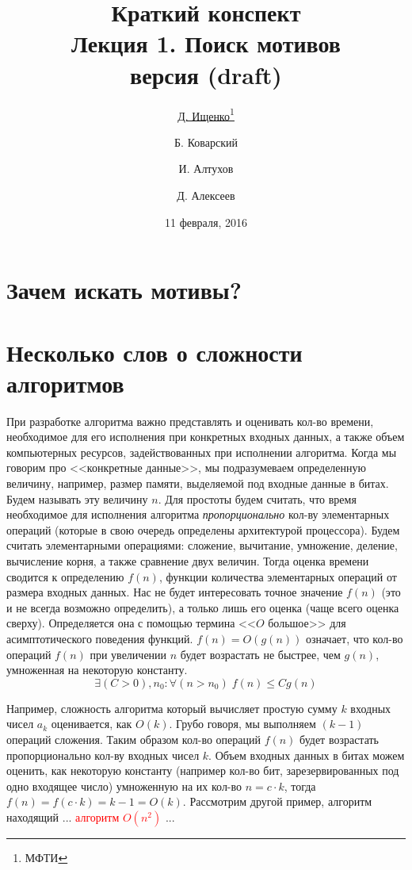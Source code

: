 \documentclass[letterpaper, 11pt]{article}
\title{\large{Краткий конспект}\\
\LARGE{Лекция 1. Поиск мотивов}\\
\normalsize версия \versionnumber (\textcolor{NavyBlue}{draft})}
\date{11 февраля, 2016}
\author{\underline{Д. Ищенко\thanks{МФТИ}} \and Б. Коварский\footnotemark[1]
\and И. Алтухов\footnotemark[1] \and Д. Алексеев\footnotemark[1]}
\begin{document}
\maketitle
\thispagestyle{empty}
\clearpage

\section{Зачем искать мотивы?}
\section{Несколько слов о сложности алгоритмов}
\par
При разработке алгоритма важно представлять и оценивать кол-во времени, 
необходимое для его исполнения при конкретных входных данных, а также объем компьютерных ресурсов,
задействованных при исполнении алгоритма. Когда мы говорим про <<конкретные данные>>, мы подразумеваем 
определенную величину, например, размер памяти, выделяемой под входные данные в битах. Будем называть эту
величину $n$. Для простоты будем считать, что время необходимое для исполнения алгоритма \textit{пропорционально}
кол-ву элементарных операций (которые в свою очередь определены архитектурой процессора). Будем считать
элементарными операциями: сложение, вычитание, умножение, деление, вычисление корня, а также сравнение двух величин. Тогда оценка 
времени сводится к определению $f(n)$, функции количества элементарных операций от размера входных данных. Нас не будет 
интересовать точное значение $f(n)$ (это и не всегда возможно определить), а только лишь его оценка (чаще всего оценка сверху). Определяется она с помощью термина <<$O$ большое>> для асимптотического поведения функций.
$f(n) = O(g(n))$ означает, что кол-во операций $f(n)$ при увеличении $n$ будет возрастать не быстрее, чем $g(n)$, умноженная на некоторую константу.
\[
\exists (C > 0), n_0 : \forall (n > n_0) \; f(n) \leq Cg(n)
\]
\par
Например, сложность алгоритма который вычисляет простую сумму $k$ входных чисел $a_k$ оценивается, как $O(k)$. Грубо говоря, мы выполняем $(k-1)$ операций сложения. Таким образом кол-во операций $f(n)$ будет возрастать пропорционально кол-ву входных чисел $k$. Объем входных данных в битах можем оценить, как некоторую константу (например кол-во бит, зарезервированных под одно входящее число) умноженную на их кол-во $n = c \cdot k$, тогда $f(n) = f(c \cdot k) = k - 1 = O(k)$. Рассмотрим другой пример, алгоритм находящий ... \textcolor{red}{алгоритм $O(n^2)$} ...
\par
\end{document}
